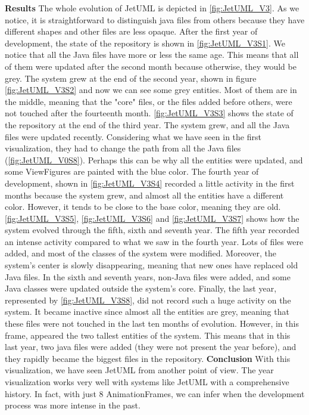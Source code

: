 \textbf{Results}
The whole evolution of JetUML is depicted in \autoref{fig:JetUML_V3}. As we notice, it is straightforward to distinguish java files from others because they have different shapes and other files are less opaque. After the first year of development, the state of the repository is shown in \autoref{fig:JetUML_V3S1}. We notice that all the Java files have more or less the same age. This means that all of them were updated after the second month because otherwise, they would be grey. The system grew at the end of the second year, shown in figure \autoref{fig:JetUML_V3S2} and now we can see some grey entities. Most of them are in the middle, meaning that the "core" files, or the files added before others, were not touched after the fourteenth month.  \autoref{fig:JetUML_V3S3} shows the state of the repository at the end of the third year. The system grew, and all the Java files were updated recently. Considering what we have seen in the first visualization, they had to change the path from all the Java files (\autoref{fig:JetUML_V0S8}). Perhaps this can be why all the entities were updated, and some ViewFigures are painted with the blue color. The fourth year of development, shown in  \autoref{fig:JetUML_V3S4} recorded a little activity in the first months because the system grew, and almost all the entities have a different color. However, it tends to be close to the base color, meaning they are old. 
\autoref{fig:JetUML_V3S5},  \autoref{fig:JetUML_V3S6} and  \autoref{fig:JetUML_V3S7} shows how the system evolved through the fifth, sixth and seventh year. The fifth year recorded an intense activity compared to what we saw in the fourth year. Lots of files were added, and most of the classes of the system were modified. Moreover, the system's center is slowly disappearing, meaning that new ones have replaced old Java files. In the sixth and seventh years, non-Java files were added, and some Java classes were updated outside the system's core. Finally, the last year, represented by \autoref{fig:JetUML_V3S8}, did not record such a huge activity on the system. It became inactive since almost all the entities are grey, meaning that these files were not touched in the last ten months of evolution. However, in this frame, appeared the two tallest entities of the system. This means that in this last year, two java files were added (they were not present the year before), and they rapidly became the biggest files in the repository.  
\bigbreak
\textbf{Conclusion}
With this visualization, we have seen JetUML from another point of view. The year visualization works very well with systems like JetUML with a comprehensive history. In fact, with just 8 AnimationFrames, we can infer when the development process was more intense in the past. 



